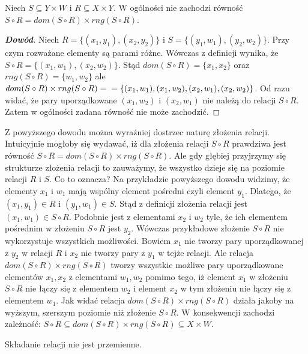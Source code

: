 \begin{property}
Niech $S\subseteq Y\times W$ i $R\subseteq X\times Y$. W ogólności nie zachodzi równość $S\circ R=dom(S\circ R)\times rng(S\circ R)$.
\end{property}
\begin{proof}[\textbf{Dowód}]
Niech $R=\{(x_{1},y_{1}),(x_{2},y_{2})\}$ i $S=\{(y_{1},w_{1}),(y_{2},w_{2})\}$. Przy czym rozważane elementy są parami różne. Wówczas z definicji wynika, że $S\circ R=\{(x_{1},w_{1}),(x_{2},w_{2})\}$. Stąd $dom(S\circ R)=\{x_{1},x_{2}\}$ oraz $rng(S\circ R)=\{w_{1},w_{2}\}$ ale $dom(S\circ R)\times rng(S\circ R)=\\=\{(x_{1},w_{1}),(x_{1},w_{2}),(x_{2},w_{1}),(x_{2},w_{2})\}$. Od razu widać, że pary uporządkowane $(x_{1},w_{2})$ i $(x_{2},w_{1})$ nie należą do relacji $S\circ R$. Zatem w ogólności zadana równość nie może zachodzić.
\end{proof}
\begin{remark}
Z powyższego dowodu można wyraźniej dostrzec naturę złożenia relacji. Intuicyjnie mogłoby się wydawać, iż dla złożenia relacji $S\circ R$ prawdziwa jest równość $S\circ R=dom(S\circ R)\times rng(S\circ R)$. Ale gdy głębiej przyjrzymy się strukturze złożenia relacji to zauważymy, że wszystko dzieje się na poziomie relacji $R$ i $S$. Co to oznacza? Na przykładzie powyższego dowodu widzimy, że elementy $x_{1}$ i $w_{1}$ mają wspólny element pośredni czyli element $y_{1}$. Dlatego, że $(x_{1},y_{1})\in R$ i $(y_{1},w_{1})\in S$. Stąd z definicji złożenia relacji jest $(x_{1},w_{1})\in S\circ R$. Podobnie jest z elementami $x_{2}$ i $w_{2}$ tyle, że ich elementem pośrednim w złożeniu $S\circ R$ jest $y_{2}$. Wówczas przykładowe złożenie $S\circ R$ nie wykorzystuje wszystkich możliwości. Bowiem $x_{1}$ nie tworzy pary uporządkowanej z $y_{2}$ w relacji $R$ i $x_{2}$ nie tworzy pary z $y_{1}$ w tejże relacji. Ale relacja $dom(S\circ R)\times rng(S\circ R)$ tworzy wszystkie możliwe pary uporządkowane elementów $x_{1}, x_{2}$ z elementami $w_{1}, w_{2}$ pomimo tego, iż element $x_{1}$ w złożeniu $S\circ R$ nie łączy się z elementem $w_{2}$ i element $x_{2}$ w tym złożeniu nie łączy się z elementem $w_{1}$. Jak widać relacja $dom(S\circ R)\times rng(S\circ R)$ działa jakoby na wyższym, szerszym poziomie niż złożenie $S\circ R$. W konsekwencji zachodzi zależność:
$S\circ R\subseteq dom(S\circ R)\times rng(S\circ R)\subseteq X\times W$.
\end{remark}
\begin{property}
Składanie relacji nie jest przemienne.
\end{property}
